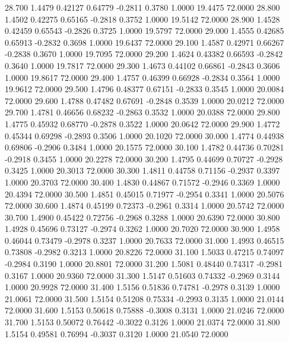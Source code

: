   28.700   1.4479   0.42127   0.64779  -0.2811   0.3780   1.0000  19.4475  72.0000
  28.800   1.4502   0.42275   0.65165  -0.2818   0.3752   1.0000  19.5142  72.0000
  28.900   1.4528   0.42459   0.65543  -0.2826   0.3725   1.0000  19.5797  72.0000
  29.000   1.4555   0.42685   0.65913  -0.2832   0.3698   1.0000  19.6437  72.0000
  29.100   1.4587   0.42971   0.66267  -0.2838   0.3670   1.0000  19.7095  72.0000
  29.200   1.4624   0.43382   0.66593  -0.2842   0.3640   1.0000  19.7817  72.0000
  29.300   1.4673   0.44102   0.66861  -0.2843   0.3606   1.0000  19.8617  72.0000
  29.400   1.4757   0.46399   0.66928  -0.2834   0.3564   1.0000  19.9612  72.0000
  29.500   1.4796   0.48377   0.67151  -0.2833   0.3545   1.0000  20.0084  72.0000
  29.600   1.4788   0.47482   0.67691  -0.2848   0.3539   1.0000  20.0212  72.0000
  29.700   1.4781   0.46656   0.68232  -0.2863   0.3532   1.0000  20.0388  72.0000
  29.800   1.4775   0.45932   0.68770  -0.2878   0.3522   1.0000  20.0642  72.0000
  29.900   1.4772   0.45344   0.69298  -0.2893   0.3506   1.0000  20.1020  72.0000
  30.000   1.4774   0.44938   0.69806  -0.2906   0.3484   1.0000  20.1575  72.0000
  30.100   1.4782   0.44736   0.70281  -0.2918   0.3455   1.0000  20.2278  72.0000
  30.200   1.4795   0.44699   0.70727  -0.2928   0.3425   1.0000  20.3013  72.0000
  30.300   1.4811   0.44758   0.71156  -0.2937   0.3397   1.0000  20.3703  72.0000
  30.400   1.4830   0.44867   0.71572  -0.2946   0.3369   1.0000  20.4394  72.0000
  30.500   1.4851   0.45015   0.71977  -0.2954   0.3341   1.0000  20.5076  72.0000
  30.600   1.4874   0.45199   0.72373  -0.2961   0.3314   1.0000  20.5742  72.0000
  30.700   1.4900   0.45422   0.72756  -0.2968   0.3288   1.0000  20.6390  72.0000
  30.800   1.4928   0.45696   0.73127  -0.2974   0.3262   1.0000  20.7020  72.0000
  30.900   1.4958   0.46044   0.73479  -0.2978   0.3237   1.0000  20.7633  72.0000
  31.000   1.4993   0.46515   0.73808  -0.2982   0.3213   1.0000  20.8226  72.0000
  31.100   1.5033   0.47215   0.74097  -0.2984   0.3190   1.0000  20.8801  72.0000
  31.200   1.5081   0.48440   0.74317  -0.2981   0.3167   1.0000  20.9360  72.0000
  31.300   1.5147   0.51603   0.74332  -0.2969   0.3144   1.0000  20.9928  72.0000
  31.400   1.5156   0.51836   0.74781  -0.2978   0.3139   1.0000  21.0061  72.0000
  31.500   1.5154   0.51208   0.75334  -0.2993   0.3135   1.0000  21.0144  72.0000
  31.600   1.5153   0.50618   0.75888  -0.3008   0.3131   1.0000  21.0246  72.0000
  31.700   1.5153   0.50072   0.76442  -0.3022   0.3126   1.0000  21.0374  72.0000
  31.800   1.5154   0.49581   0.76994  -0.3037   0.3120   1.0000  21.0540  72.0000
